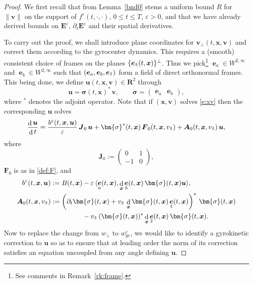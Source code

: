 \documentclass[10pt]{amsart}
\newcommand{\sperp}{{\scriptscriptstyle\perp}}
\let\eps\varepsilon
\let\d\partial
\DeclareMathOperator\dD{d}\let\dd\dD
\theoremstyle{plain}
\theoremstyle{definition}
\newcommand{\be}{\begin{equation}}
\newcommand{\ee}{\end{equation}}
\newcommand\R{\mathbf R}
\newcommand\bA{{\boldsymbol A}}
\newcommand\bE{{\boldsymbol E}}
\newcommand\bF{{\boldsymbol F}}
\newcommand\bJ{{\boldsymbol J}}
\newcommand\bfu{{\boldsymbol u}}
\newcommand\bfv{{\boldsymbol v}}
\newcommand\bfx{{\boldsymbol x}}
\newcommand\bfsigma{\bm{\sigma}}
\DeclareMathOperator{\beD}{\boldsymbol{e}}
\newcommand\eDpar{\beD_\mypar}
\newcommand\eDa{\beD_a}
\newcommand\eDb{\beD_b}
\newcommand\vpar{v_\mypar}
\newcommand\bvperp{\bfv_{\!\sperp}}
\newcommand\eperp{w_{\!\sperp}}
\newcommand{\eGC}{w_\mathrm{gc}}
\newcommand{\mypar}{{\mkern3mu\vphantom{\perp}\vrule depth 0pt\mkern2mu\vrule depth 0pt\mkern3mu}}
\begin{document}
\begin{proof}
We first recall that from Lemma~\ref{bnd0} stems a uniform bound $R$ for $\|\bfv\|$ on the support of $f^\eps(t,\cdot,\cdot)$, $0\leq t\leq T$, $\eps>0$, and that we have already derived bounds on $\bE^\eps$, $\d_t\bE^\eps$ and their spatial derivatives.

To carry out the proof, we shall introduce plane coordinates for $\bvperp(t,\bfx,\bfv)$ and correct them according to the gyrocenter dynamics. This requires a (smooth) consistent choice of frames on the planes $\{\eDpar(t,\bfx)\}^\perp$. Thus we pick\footnote{See comments in Remark~\ref{rk:frame}.} $\eDa\in W^{2,\infty}$ and $\eDb\in W^{2,\infty}$ such that $(\eDa,\eDb,\eDpar)$ form a field of direct orthonormal frames. This being done, we define $\bfu(t,\bfx,\bfv)\in \R^2$ through
\be
\label{def:u}
\bfu=\bfsigma(t,\bfx)^*\,\bfv,\qquad
\bfsigma=\begin{pmatrix}\eDa&\eDb
\end{pmatrix},
\ee
where ${}^*$ denotes the adjoint operator. Note that if $(\bfx,\bfv)$ solves \eqref{e:xv} then the corresponding $\bfu$ solves
\be
\label{e:u}
\frac{\dD\bfu}{\dD t}=
\frac{b^\eps(t,\bfx,\bfu)}{\eps}\, \bJ_0\,\bfu
+\bfsigma^*(t,\bfx)\,\bF_0(t,\bfx,\vpar)+\bA_0(t,\bfx,\vpar)\,\bfu,
\ee
where
\be\label{def:J0}
\bJ_0:=\begin{pmatrix}0&1\\-1&0\end{pmatrix},
\ee
$\bF_0$ is as in \eqref{def:F}, and
\begin{align}
\label{def:b0}
b^\eps(t,\bfx,\bfu)&:=
B(t,\bfx)-\eps\,\langle\eDa(t,\bfx),
\dD_\bfx\eDb(t,\bfx)\,\bfsigma(t,\bfx)\bfu\rangle,
\\
\label{def:bA0}
\bA_0(t,\bfx,\vpar)&:=
\left(\d_t\bfsigma(t,\bfx)+\vpar\,\dD_\bfx\bfsigma(t,\bfx)\eDpar(t,\bfx)\right)^*\,\bfsigma(t,\bfx)\\
&\hphantom{{}:=
B(t,\bfx)}-\vpar\,(\bfsigma(t,\bfx))^*\dD_\bfx\eDpar(t,\bfx)\,\bfsigma(t,\bfx).\notag
\end{align}
Now to replace the change from $\eperp$ to $\eGC^\eps$, we would like to identify a gyrokinetic correction to $\bfu$ so as to ensure that at leading order the norm of its correction satisfies an equation uncoupled from any angle defining $\bfu$.


\end{proof}
\end{document}
